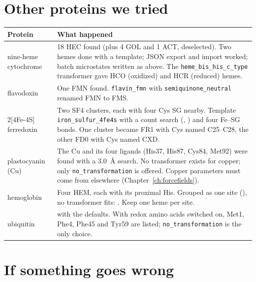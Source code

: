 \section{Other proteins we tried}
\label{sec:redox-others}

\begin{tabularx}{\linewidth}{@{}lL@{}}
\toprule
\textbf{Protein} & \textbf{What happened} \\
\midrule
{} nine-heme cytochrome &
  18 HEC found (plus 4 GOL and 1 ACT, deselected). Two hemes done with a
  template; JSON export and import worked; batch microstates written as above.
  The \texttt{heme\_bis\_his\_c\_type} transformer gave HCO (oxidized) and
  HCR (reduced) hemes. \\
 flavodoxin &
  One FMN found. \texttt{flavin\_fmn} with \texttt{semiquinone\_neutral}
  renamed FMN to FMS. \\
 2[4Fe-4S] ferredoxin &
  Two SF4 clusters, each with four Cys SG nearby. Template
  \texttt{iron\_sulfur\_4fe4s} with a count search (, )
  and four Fe--SG bonds. One cluster became FR1 with Cys named C25--C28, the
  other FD0 with Cys named CXD. \\
 plastocyanin (Cu) &
  The Cu and its four ligands (His37, His87, Cys84, Met92) were found with a
  3.0~\AA{} search. No transformer exists for copper; only
  \texttt{no\_transformation} is offered. Copper parameters must come from
  elsewhere (Chapter~\ref{ch:forcefields}). \\
 hemoglobin &
  Four HEM, each with its proximal His. Grouped as one site (),
  no transformer fits: .
  Keep one heme per site. \\
 ubiquitin &
   with the defaults. With redox
  amino acids switched on, Met1, Phe4, Phe45 and Tyr59 are listed;
  \texttt{no\_transformation} is the only choice. \\
\bottomrule
\end{tabularx}

\section{If something goes wrong}
\label{sec:redox-problems}

